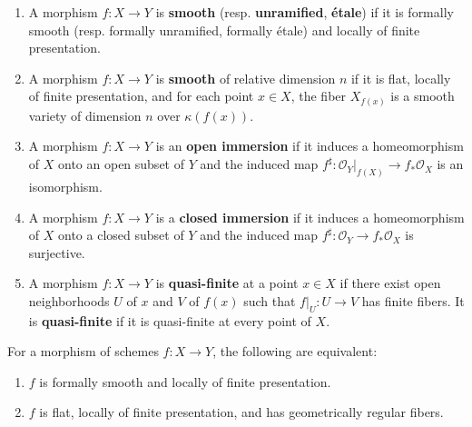 \documentclass[12pt]{article}
\begin{document}
\begin{definition}
\begin{enumerate}
        \item A morphism $f: X \to Y$ is \textbf{smooth} (resp. \textbf{unramified}, \textbf{étale}) if it is formally smooth (resp. formally unramified, formally étale) and locally of finite presentation.
        \item A morphism $f: X \to Y$ is \textbf{smooth} of relative dimension $n$ if it is flat, locally of finite presentation, and for each point $x \in X$, the fiber $X_{f(x)}$ is a smooth variety of dimension $n$ over $\kappa(f(x))$.
        \item A morphism $f: X \to Y$ is an \textbf{open immersion} if it induces a homeomorphism of $X$ onto an open subset of $Y$ and the induced map $f^\sharp: \mathcal{O}_Y|_{f(X)} \to f_*\mathcal{O}_X$ is an isomorphism.
        \item A morphism $f: X \to Y$ is a \textbf{closed immersion} if it induces a homeomorphism of $X$ onto a closed subset of $Y$ and the induced map $f^\sharp: \mathcal{O}_Y \to f_*\mathcal{O}_X$ is surjective.
        \item A morphism $f: X \to Y$ is \textbf{quasi-finite} at a point $x \in X$ if there exist open neighborhoods $U$ of $x$ and $V$ of $f(x)$ such that $f|_U: U \to V$ has finite fibers. It is \textbf{quasi-finite} if it is quasi-finite at every point of $X$.
    \end{enumerate}
\end{definition}

\begin{theorem}
    For a morphism of schemes $f: X \to Y$, the following are equivalent:
    \begin{enumerate}
        \item $f$ is formally smooth and locally of finite presentation.
        \item $f$ is flat, locally of finite presentation, and has geometrically regular fibers.
    \end{enumerate}
\end{theorem}
\end{document}

